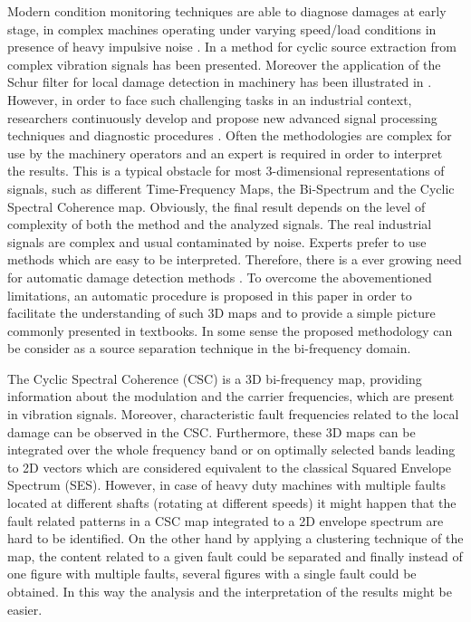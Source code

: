 \documentclass[11pt]{article}
\begin{document}
Modern condition monitoring techniques are able to diagnose damages at early stage, in complex machines operating under varying speed/load conditions in presence of heavy impulsive noise \cite{wylomanska2017application,borghesani2013new,schmidt2018novelty,gryllias2018application,javorskyj2016periodically}. In \cite{kruczek2017cyclic} a method for cyclic source extraction from complex vibration signals has been presented. Moreover the application of the Schur filter for local damage detection in machinery has been illustrated in \cite{makowski2014new}.
However, in order to face such challenging tasks in an industrial context, researchers continuously develop and propose new advanced signal processing techniques and diagnostic procedures \cite{wylomanska2016impulsive, hu2016development, michalak2017application}. Often the methodologies are complex for use by the machinery operators and an expert is required in order to interpret the results. This is a typical obstacle for most 3-dimensional representations of signals, such as different Time-Frequency Maps, the Bi-Spectrum and the Cyclic Spectral Coherence map\cite{kruczek2017multiple}. Obviously, the final result depends on the level of complexity of both the method and the analyzed signals. 
The real industrial signals are complex and usual contaminated by noise. Experts prefer to use methods which are easy to be interpreted. Therefore, there is a ever growing need for automatic damage detection methods \cite{wodecki2018optimal}. To overcome the abovementioned limitations, an automatic procedure is proposed in this paper in order to facilitate the understanding of such 3D maps and to provide a simple picture commonly presented in textbooks. In some sense the proposed methodology can be consider as a source separation technique in the bi-frequency domain. 

The Cyclic Spectral Coherence (CSC) is a 3D bi-frequency map, providing information about the modulation and the carrier frequencies, which are present in vibration signals. Moreover, characteristic fault frequencies related to the local damage can be observed in the CSC. Furthermore, these 3D maps can be integrated over the whole frequency band or on optimally selected bands leading to 2D vectors which are considered equivalent to the classical Squared Envelope Spectrum (SES).
However, in case of heavy duty machines with multiple faults located at different shafts (rotating at different speeds) it might happen that the fault related patterns in a CSC map integrated to a 2D envelope spectrum are hard to be identified. On the other hand by applying a clustering technique of the map, the content related to a given fault could be separated and finally instead of one figure with multiple faults, several figures with a single fault could be obtained. In this way the analysis and the interpretation of the results might be easier.
\end{document}
